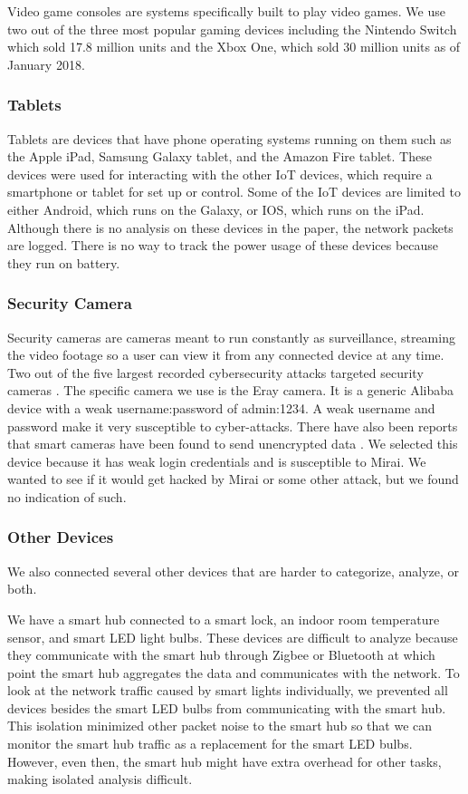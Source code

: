 Video game consoles are systems specifically built to play video games. We use two out of the three most popular gaming devices including the Nintendo Switch which sold 17.8 million units \cite{nintendo} and the Xbox One, which sold 30 million units \cite{souppouris_2016} as of January 2018.

\subsubsection{Tablets}

Tablets are devices that have phone operating systems running on them such as the Apple iPad, Samsung Galaxy tablet, and the Amazon Fire tablet. These devices were used for interacting with the other IoT devices, which require a smartphone or tablet for set up or control. Some of the IoT devices are limited to either Android, which runs on the Galaxy, or IOS, which runs on the iPad. Although there is no analysis on these devices in the paper, the network packets are logged. There is no way to track the power usage of these devices because they run on battery.

\subsubsection{Security Camera}

Security cameras are cameras meant to run constantly as surveillance, streaming the video footage so a user can view it from any connected device at any time. Two out of the five largest recorded cybersecurity attacks targeted security cameras \cite{guest_2018}. The specific camera we use is the Eray camera. It is a generic Alibaba device with a weak username:password of admin:1234. A weak username and password make it very susceptible to cyber-attacks. There have also been reports that smart cameras have been found to send unencrypted data \cite{feamster_2016}. We selected this device because it has weak login credentials and is susceptible to Mirai. We wanted to see if it would get hacked by Mirai or some other attack, but we found no indication of such.

\subsubsection{Other Devices}

We also connected several other devices that are harder to categorize, analyze, or both.

We have a smart hub connected to a smart lock, an indoor room temperature sensor, and smart LED light bulbs. These devices are difficult to analyze because they communicate with the smart hub through Zigbee or Bluetooth at which point the smart hub aggregates the data and communicates with the network. To look at the network traffic caused by smart lights individually, we prevented all devices besides the smart LED bulbs from communicating with the smart hub. This isolation minimized other packet noise to the smart hub so that we can monitor the smart hub traffic as a replacement for the smart LED bulbs. However, even then, the smart hub might have extra overhead for other tasks, making isolated analysis difficult.

